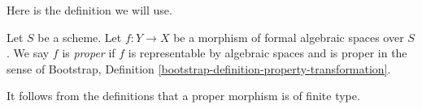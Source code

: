 \noindent
Here is the definition we will use.

\begin{definition}
\label{definition-proper}
Let $S$ be a scheme. Let $f : Y \to X$ be a morphism of formal algebraic
spaces over $S$. We say $f$ is {\it proper}
if $f$ is representable by algebraic spaces and is proper in the sense of
Bootstrap, Definition \ref{bootstrap-definition-property-transformation}.
\end{definition}

\noindent
It follows from the definitions that a proper morphism is of finite type.




















